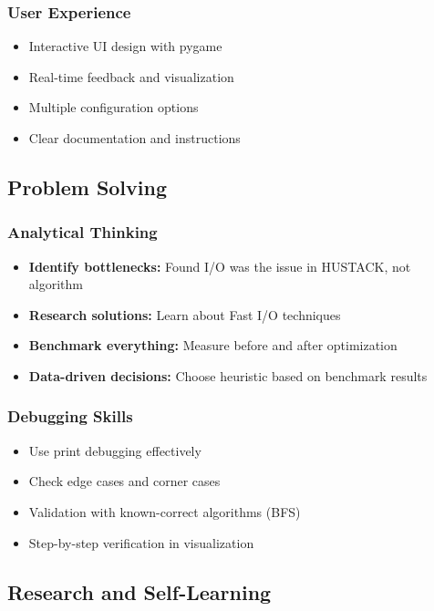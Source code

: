 \documentclass[12pt,a4paper]{article}
\begin{document}
\subsubsection{User Experience}
\begin{itemize}
    \item Interactive UI design with pygame
    \item Real-time feedback and visualization
    \item Multiple configuration options
    \item Clear documentation and instructions
\end{itemize}

\subsection{Problem Solving}

\subsubsection{Analytical Thinking}
\begin{itemize}
    \item \textbf{Identify bottlenecks:} Found I/O was the issue in HUSTACK, not algorithm
    \item \textbf{Research solutions:} Learn about Fast I/O techniques
    \item \textbf{Benchmark everything:} Measure before and after optimization
    \item \textbf{Data-driven decisions:} Choose heuristic based on benchmark results
\end{itemize}

\subsubsection{Debugging Skills}
\begin{itemize}
    \item Use print debugging effectively
    \item Check edge cases and corner cases
    \item Validation with known-correct algorithms (BFS)
    \item Step-by-step verification in visualization
\end{itemize}

\subsection{Research and Self-Learning}
\end{document}

